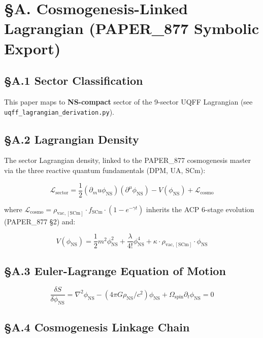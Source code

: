 \documentclass[12pt,a4paper]{article}
\begin{document}
\section{\S{}A. Cosmogenesis-Linked Lagrangian (PAPER\_877 Symbolic Export)}

\subsection{\S{}A.1 Sector Classification}

This paper maps to \textbf{NS-compact} sector of the 9-sector UQFF Lagrangian (see \texttt{uqff\_{lagrangian\_derivation}.py}).

\subsection{\S{}A.2 Lagrangian Density}

The sector Lagrangian density, linked to the PAPER\_877 cosmogenesis master via the three reactive quantum fundamentals (DPM, UA, SCm):

\begin{equation}
\mathcal{L}_{\mathrm{sector}} = \frac{1}{2}(\partial_mu \phi_{\mathrm{NS}})(\partial^\mu \phi_{\mathrm{NS}}) - V(\phi_{\mathrm{NS}}) + \mathcal{L}_{\mathrm{cosmo}}
\end{equation}

where $\mathcal{L}_{\mathrm{cosmo}} = \rho_{\mathrm{vac,[SCm]}} \cdot f_{\mathrm{SCm}} \cdot (1 - e^{-\gamma t})$ inherits the ACP 6-stage evolution (PAPER\_877 \S{}2) and:

\begin{equation}
V(\phi_{\mathrm{NS}}) = \frac{1}{2} m^2 \phi_{\mathrm{NS}}^2 + \frac{\lambda}{4!} \phi_{\mathrm{NS}}^4 + \kappa \cdot \rho_{\mathrm{vac,[SCm]}} \cdot \phi_{\mathrm{NS}}
\end{equation}

\subsection{\S{}A.3 Euler-Lagrange Equation of Motion}

\begin{equation}
\boxed{\frac{\delta S}{\delta \phi_{\mathrm{NS}}} = \nabla^2 \phi_{\mathrm{NS}} - (4\pi G \rho_{\mathrm{NS}}/c^2)\phi_{\mathrm{NS}} + \Omega_{\mathrm{spin}} \partial_t \phi_{\mathrm{NS}} = 0}
\end{equation}

\subsection{\S{}A.4 Cosmogenesis Linkage Chain}
\end{document}
